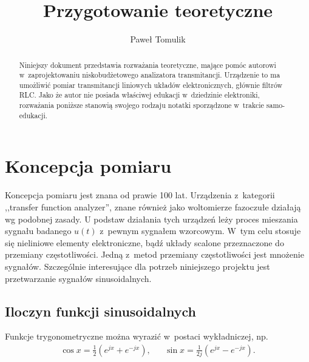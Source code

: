 \documentclass[paper=a4,DIV=12]{tfa}
\begin{document}
\title{Przygotowanie teoretyczne}
\author{Paweł Tomulik}
\date{}
\maketitle

\begin{abstract}
  Niniejszy dokument przedstawia rozważania teoretyczne, mające pomóc autorowi
  w~zaprojektowaniu niskobudżetowego analizatora transmitancji. Urządzenie to
  ma umożliwić pomiar transmitancji liniowych układów elektronicznych, głównie
  filtrów RLC. Jako że autor nie posiada właściwej edukacji w~dziedzinie
  elektroniki, rozważania poniższe stanowią swojego rodzaju notatki sporządzone
  w~trakcie samo-edukacji.
\end{abstract}

\section{Koncepcja pomiaru}
\label{sec:6C4QN}

Koncepcja pomiaru jest znana od prawie 100 lat. Urządzenia z~kategorii
,,transfer function analyzer'', znane również jako woltomierze fazoczułe
działają wg podobnej zasady. U podstaw działania tych urządzeń leży proces
mieszania sygnału badanego $u(t)$ z~pewnym sygnałem wzorcowym. W~tym celu
stosuje się nieliniowe elementy elektroniczne, bądź układy scalone przeznaczone
do przemiany częstotliwości. Jedną z~metod przemiany częstotliwości jest
mnożenie sygnałów. Szczególnie interesujące dla potrzeb niniejszego projektu
jest przetwarzanie sygnałów sinusoidalnych.

\subsection{Iloczyn funkcji sinusoidalnych}
\label{sec:NZPSA}

Funkcje trygonometryczne można wyrazić w~postaci wykładniczej, np.
\begin{align}
  & \cos x = \frac{1}{2} \left( e^{jx} + e^{-jx}\right), &
  & \sin x = \frac{1}{2j} \left( e^{jx} - e^{-jx}\right). &
  \label{eq:7R2OT}
\end{align}
\end{document}
